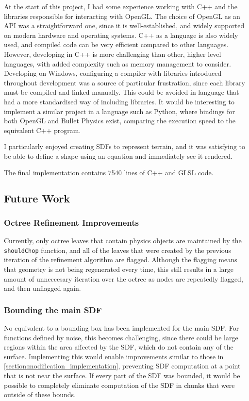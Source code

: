 \documentclass[11pt]{article}
\begin{document}
At the start of this project, I had some experience working with C++ and the libraries responsible for interacting with OpenGL. The choice of OpenGL as an API was a straightforward one, since it is well-established, and widely supported on modern hardware and operating systems. C++ as a language is also widely used, and compiled code can be very efficient compared to other languages. However, developing in C++ is more challenging than other, higher level languages, with added complexity such as memory management to consider. Developing on Windows, configuring a compiler with libraries introduced throughout development was a source of particular frustration, since each library must be compiled and linked manually. This could be avoided in language that had a more standardised way of including libraries. It would be interesting to implement a similar project in a language such as Python, where bindings for both OpenGL and Bullet Physics exist, comparing the execution speed to the equivalent C++ program.

I particularly enjoyed creating SDFs to represent terrain, and it was satisfying to be able to define a shape using an equation and immediately see it rendered. 

The final implementation contains 7540 lines of C++ and GLSL code.

\subsection{Future Work}
\label{section:future_work}
\subsubsection{Octree Refinement Improvements}
Currently, only octree leaves that contain physics objects are maintained by the \texttt{shouldChop} function, and all of the leaves that were created by the previous iteration of the refinement algorithm are flagged. Although the flagging means that geometry is not being regenerated every time, this still results in a large amount of unneccesary iteration over the octree as nodes are repeatedly flagged, and then unflagged again.
\subsubsection{Bounding the main SDF}
No equivalent to a bounding box has been implemented for the main SDF. For functions defined by noise, this becomes challenging, since there could be large regions within the area affected by the SDF, which do not contain any of the surface. Implementing this would enable improvements similar to those in \ref{section:modification_implementation}, preventing SDF computation at a point that is not near the surface. If every part of the SDF was bounded, it would be possible to completely eliminate computation of the SDF in chunks that were outside of these bounds.
\end{document}

